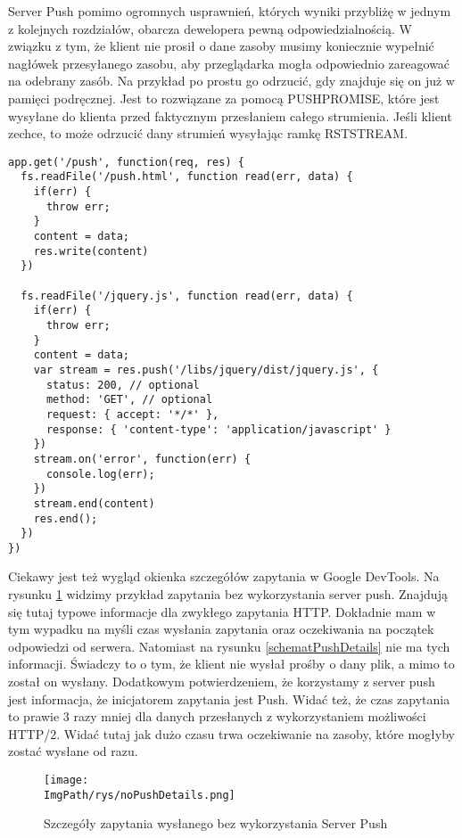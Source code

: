 \documentclass[a4paper,12pt,twoside,openany]{report}
\newcommand{\ImgPath}{.}
\begin{document}
Server Push pomimo ogromnych usprawnień, których wyniki przybliżę w jednym z kolejnych rozdziałów, obarcza dewelopera pewną odpowiedzialnością.
W związku z tym, że klient nie prosił o dane zasoby musimy koniecznie wypełnić nagłówek przesyłanego zasobu, aby przeglądarka mogła odpowiednio zareagować na odebrany zasób.
Na przykład po prostu go odrzucić, gdy znajduje się on już w pamięci podręcznej.
Jest to rozwiązane za pomocą PUSH\textunderscore PROMISE, które jest wysyłane do klienta przed faktycznym przesłaniem całego strumienia.
Jeśli klient zechce, to może odrzucić dany strumień wysyłając ramkę RST\textunderscore STREAM.

\begin{lstlisting}
app.get('/push', function(req, res) {
  fs.readFile('/push.html', function read(err, data) {
    if(err) {
      throw err;
    }
    content = data;
    res.write(content)
  })

  fs.readFile('/jquery.js', function read(err, data) {
    if(err) {
      throw err;
    }
    content = data;
    var stream = res.push('/libs/jquery/dist/jquery.js', {
      status: 200, // optional
      method: 'GET', // optional
      request: { accept: '*/*' },
      response: { 'content-type': 'application/javascript' }
    })
    stream.on('error', function(err) {
      console.log(err);
    })
    stream.end(content)
    res.end();
  })
})
\end{lstlisting}

Ciekawy jest też wygląd okienka szczegółów zapytania w Google DevTools.
Na rysunku \ref{schematNoPushDetails} widzimy przykład zapytania bez wykorzystania server push.
Znajdują się tutaj typowe informacje dla zwykłego zapytania HTTP.
Dokładnie mam w tym wypadku na myśli czas wysłania zapytania oraz oczekiwania na początek odpowiedzi od serwera.
Natomiast na rysunku \ref{schematPushDetails} nie ma tych informacji.
Świadczy to o tym, że klient nie wysłał prośby o dany plik, a mimo to został on wysłany.
Dodatkowym potwierdzeniem, że korzystamy z server push jest informacja, że inicjatorem zapytania jest Push.
Widać też, że czas zapytania to prawie 3 razy mniej dla danych przesłanych z wykorzystaniem możliwości HTTP/2.
Widać tutaj jak dużo czasu trwa oczekiwanie na zasoby, które mogłyby zostać wysłane od razu.

\begin{figure}[!htbp]
	\begin{center}
\centering
\texttt{[image: \\ImgPath/rys/noPushDetails.png]}
\end{center}
	\caption{Szczegóły zapytania wysłanego bez wykorzystania Server Push}
	\label{schematNoPushDetails}
\end{figure}
\end{document}
